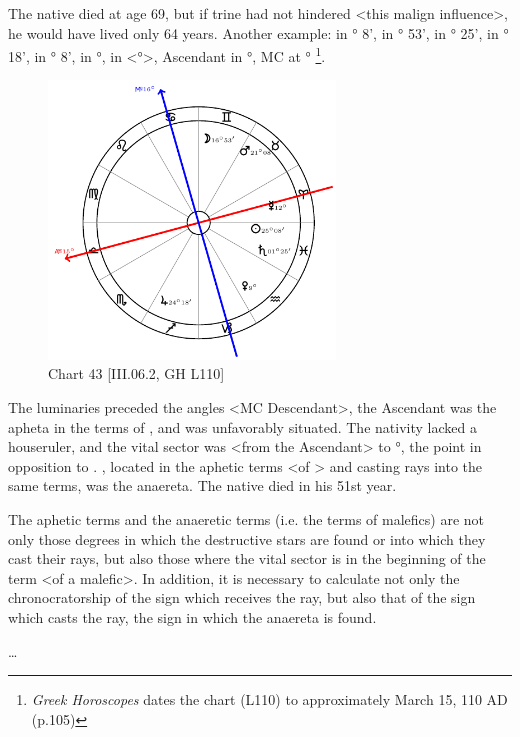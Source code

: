 The native died at age 69, but if \Jupiter\xspace trine had not hindered <this malign influence>, he would have lived only 64 years.
\newpage
Another example: \Sun\xspace in \Pisces\xspace 25° 8', \Moon\xspace in \Gemini\xspace 16° 53', \Saturn\xspace in \Pisces\xspace 1° 25', \Jupiter\xspace in
\Sagittarius\xspace 24° 18', \Mars\xspace in \Taurus\xspace 21° 8', \Venus\xspace in \Aquarius\xspace 9°, \Mercury\xspace in <°>, Ascendant in \Libra\xspace 15°, MC at \Cancer\xspace 16°
\footnote{\textit{Greek Horoscopes} dates the chart (L110) to approximately March 15, 110 AD (p.105)}.  

\clearpage
\begin{figure}
\centering
\vspace{-20pt}
\includegraphics[width=0.68\textwidth]{charts/3_06_2}
\caption{Chart 43 [III.06.2, GH L110]}
\label{fig:chart43}
\end{figure} 

The luminaries preceded the angles <MC Descendant>, the Ascendant was the apheta in the terms of \Jupiter, and \Jupiter\xspace was unfavorably situated. The nativity lacked a houseruler, and the vital sector was <from the Ascendant> to \Scorpio\xspace 21°, the point in opposition to \Mars. \Mars, located in the aphetic terms <of \Jupiter> and casting rays into the same terms, was the anaereta. The
native died in his 51st year.

The aphetic terms and the anaeretic terms (i.e. the terms of malefics) are not only those degrees in which the destructive stars are found or into which they cast their rays, but also those where the vital sector
is in the beginning of the term <of a malefic>. In addition, it is necessary to calculate not only the chronocratorship of the sign which receives the ray, but also that of the sign which casts the ray, the sign in which the anaereta is found.

\ldots
\newpage